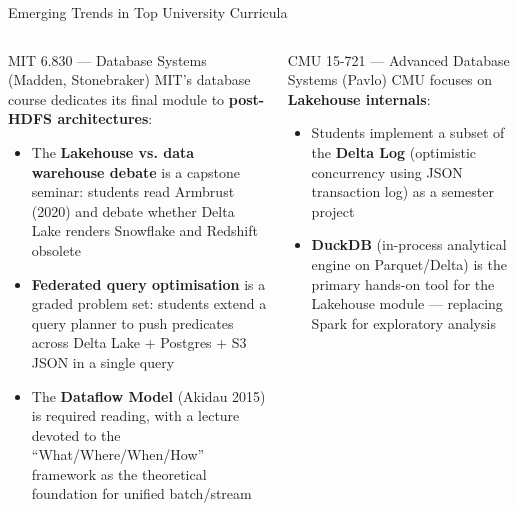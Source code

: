 \documentclass[aspectratio=169,10pt]{beamer}
\begin{document}
\begin{frame}{Emerging Trends in Top University Curricula}
  \begin{columns}[T]
      \begin{block}{MIT 6.830 — Database Systems (Madden, Stonebraker)}
        \small MIT's database course dedicates its final module to \textbf{post-HDFS architectures}:
        \begin{itemize}
          \item The \textbf{Lakehouse vs. data warehouse debate} is a capstone seminar: students read Armbrust (2020) and debate whether Delta Lake renders Snowflake and Redshift obsolete
          \item \textbf{Federated query optimisation} is a graded problem set: students extend a query planner to push predicates across Delta Lake + Postgres + S3 JSON in a single query
          \item The \textbf{Dataflow Model} (Akidau 2015) is required reading, with a lecture devoted to the ``What/Where/When/How'' framework as the theoretical foundation for unified batch/stream
        \end{itemize}
      \end{block}
      \vspace{4pt}
      \begin{exampleblock}{CMU 15-721 — Advanced Database Systems (Pavlo)}
        \small CMU focuses on \textbf{Lakehouse internals}:
        \begin{itemize}
          \item Students implement a subset of the \textbf{Delta Log} (optimistic concurrency using JSON transaction log) as a semester project
          \item \textbf{DuckDB} (in-process analytical engine on Parquet/Delta) is the primary hands-on tool for the Lakehouse module --- replacing Spark for exploratory analysis
        \end{itemize}
      \end{exampleblock}


\end{columns}
\end{frame}
\end{document}
